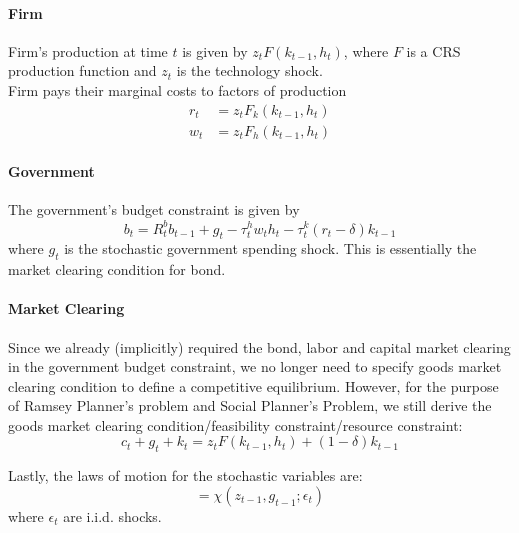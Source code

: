 \documentclass[12pt]{article}
\begin{document}
	\paragraph{Firm}
	Firm's production at time $t$ is given by $z_tF(k_{t-1}, h_t)$, where $F$ is a CRS production function and $z_t$ is the technology shock.\\
	Firm pays their marginal costs to factors of production
	\begin{align}
		r_t &= z_t F_k(k_{t-1}, h_t) \label{eq:45}\\
		w_t &= z_t F_h(k_{t-1}, h_t)	\label{eq:46}
	\end{align}
	
	\paragraph{Government}
	The government's budget constraint is given by
	\begin{equation}
		b_t = R_t^{b}b_{t-1} + g_t - \tau_t^hw_th_t - \tau_t^k (r_t - \delta)k_{t-1} \label{eq:47}
	\end{equation}
	where $g_t$ is the stochastic government spending shock. This is essentially the market clearing condition for bond.
	
	\noindent
	\paragraph{Market Clearing} Since we already (implicitly) required the bond, labor and capital market clearing in the government budget constraint, we no longer need to specify goods market clearing condition to define a competitive equilibrium. However, for the purpose of Ramsey Planner's problem and Social Planner's Problem, we still derive the goods market clearing condition/feasibility constraint/resource constraint:
	\begin{equation} \label{eq:rc}
		c_t + g_t + k_t = z_t F(k_{t-1}, h_t) + (1-\delta)k_{t-1}
	\end{equation}

	\noindent
	Lastly, the laws of motion for the stochastic variables are:
	\begin{equation*} 
		[z_t, g_t] = \chi(z_{t-1}, g_{t-1}; \epsilon_t)
	\end{equation*}
	where $\epsilon_t$ are i.i.d. shocks.
	
\end{document}
